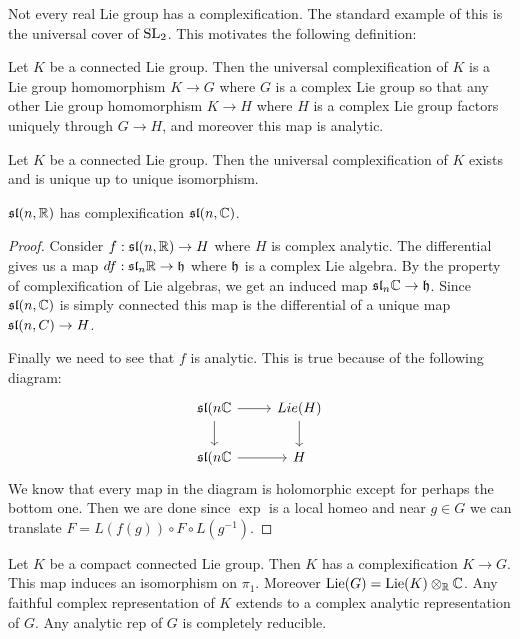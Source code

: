 \documentclass[12pt]{article}
\begin{document}
Not every real Lie group has a complexification. The standard example of this 
is the universal cover of $\SL_2$. This motivates the following definition: \begin{definition}
    Let $K$ be a connected Lie group. Then the universal complexification of $K$
    is a Lie group homomorphism $K\to G$ where $G$ is a complex Lie group so that
    any other Lie group homomorphism $K\to H$ where $H$ is a complex Lie group factors
    uniquely through $G\to H$, and moreover this map is analytic.
\end{definition}

\begin{theorem}
    Let $K$ be a connected Lie group. Then the universal complexification of $K$
    exists and is unique up to unique isomorphism.
\end{theorem}

\begin{theorem}
    $\sl(n,\R)$ has complexification $\sl(n,\C)$.
\end{theorem}

\begin{proof}
    Consider $f:\sl(n,\R)\to H$ where $H$ is complex analytic. The differential gives us a map 
    $df:\mf{sl}_n\R\to \mf h$ where $\mf h$ is a complex Lie algebra. By the property of 
    complexification of Lie algebras, we get an induced map $\mf{sl}_n\C\to \mf h$. 
    Since $\mf{sl}(n,\C)$ is simply connected this map is the differential of a unique map $\sl(n,C)\to H$.

    Finally we need to see that $f$ is analytic. This is true because of the following diagram:
\[\begin{tikzcd}
	\sl(n\C & Lie(H) \\
	\sl(n\C & H
	\arrow[from=1-1, to=1-2]
	\arrow[from=1-2, to=2-2]
	\arrow[from=2-1, to=2-2]
	\arrow[from=1-1, to=2-1]
\end{tikzcd}\] We know that every map in the diagram is holomorphic except for perhaps the bottom one. Then we are done
since $\exp$ is a local homeo and near $g\in G$ we can translate $F = L(f(g))\circ F\circ L(g^{-1})$.\end{proof}

\begin{theorem}
    Let $K$ be a compact connected Lie group. Then $K$ has a complexification $K\to G$. This map induces 
    an isomorphism on $\pi_1$. Moreover $\Lie(G) = \Lie(K)\otimes_\R\C$. Any faithful complex 
    representation of $K$ extends to a complex analytic representation of $G$. Any analytic rep of $G$ is completely reducible.
\end{theorem}
\end{document}
